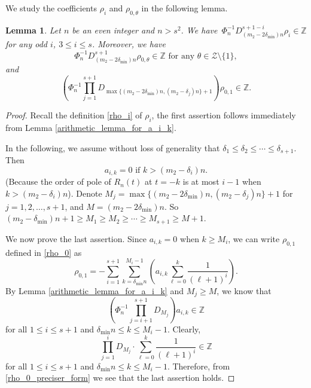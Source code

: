 \documentclass[11pt]{amsart}
\newtheorem{lemma}[theorem]{Lemma}
\numberwithin{equation}{section}
\begin{document}
\bigskip

We study the coefficients $\rho_i$ and $\rho_{0,\theta}$ in the following lemma.
\begin{lemma}\label{arithmeticlemma}
Let $n$ be an even integer and $n > s^2$. We have~$\Phi_{n}^{-1} D_{(m_2-2\delta_{\min})n}^{s+1-i}  \rho_i \in \mathbb{Z}$ for any odd $i$, $3 \leqslant i \leqslant s$. Moreover, we have
\[ \Phi_{n}^{-1} D_{(m_2-2\delta_{\min})n}^{s+1} \rho_{0,\theta} \in \mathbb{Z} \text {~for any~} \theta \in \mathcal{Z}\setminus\{1\},\]
and
\[\left( \Phi_{n}^{-1}  \prod_{j=1}^{s+1} D_{\max\{ (m_2-2\delta_{\min})n, (m_2 - \delta_j)n \}+1} \right) \rho_{0,1} \in \mathbb{Z}.  \]
\end{lemma}

\begin{proof}
Recall the definition \eqref{rho_i} of $\rho_i$, the first assertion follows immediately from Lemma \ref{arithmetic_lemma_for_a_i_k}.

In the following, we assume without loss of generality that $\delta_1 \leqslant \delta_2 \leqslant \cdots \leqslant \delta_{s+1}$. Then
\[ a_{i,k} = 0 \text{~if~} k > (m_2- \delta_{i})n. \]
(Because the order of pole of $R_n(t)$ at $t=-k$ is at most $i-1$ when $k > (m_2- \delta_{i})n$). Denote $M_j = \max\{ (m_2-2\delta_{\min})n, (m_2 - \delta_j)n \}+1$ for $j=1,2,\ldots,s+1$, and $M = (m_2-2\delta_{\min})n$. So $(m_2 - \delta_{\min})n+1 \geqslant M_1 \geqslant M_2 \geqslant \cdots \geqslant M_{s+1} \geqslant M+1$.

We now prove the last assertion. Since $a_{i,k} = 0$ when $k \geqslant M_i$, we can write $\rho_{0,1}$ defined in \eqref{rho_0} as
\begin{equation}\label{rho_0_preciser_form}
\rho_{0, 1}=- \sum_{i=1}^{s+1} \sum_{k = \delta_{\min}n}^{M_{i}-1} \left( a_{i,k} \sum_{\ell=0}^{k}  \frac{1}{(\ell+1)^{i}} \right).
\end{equation}
By Lemma \ref{arithmetic_lemma_for_a_i_k} and $M_j \geqslant M$, we know that
\[ \left( \Phi_{n}^{-1}  \prod_{j=i+1}^{s+1} D_{M_j} \right) a_{i,k} \in \mathbb{Z} \]
for all $1 \leqslant i \leqslant s+1$ and $\delta_{\min}n \leqslant k \leqslant M_{i}-1$. Clearly,
\[ \prod_{j=1}^{i} D_{M_j} \cdot  \sum_{\ell=0}^{k}  \frac{1}{(\ell+1)^{i}} \in \mathbb{Z} \]
for all $1 \leqslant i \leqslant s+1$ and $\delta_{\min}n \leqslant k \leqslant M_{i}-1$. Therefore, from \eqref{rho_0_preciser_form} we see that the last assertion holds.


\end{proof}
\end{document}
